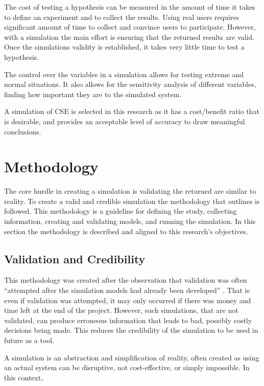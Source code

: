 The cost of testing a hypothesis can be measured in the amount of time it takes to define an experiment and to collect the results.
Using real users requires significant amount of time to collect and convince users to participate.
However, with a simulation the main effort is ensuring that the returned results are valid.
Once the simulations validity is established, it takes very little time to test a hypothesis.

The control over the variables in a simulation allows for testing extreme and normal situations.
It also allows for the sensitivity analysis of different variables, finding how important they are to the simulated system.

A simulation of CSE is selected in this research as it has a cost/benefit ratio that is desirable,
and provides an acceptable level of accuracy to draw meaningful conclusions.

\section{Methodology}
The core hurdle in creating a simulation is validating the returned are similar to reality.
To create a valid and credible simulation the methodology that \citep{Law2005} outlines is followed.
This methodology is a guideline for defining the study, collecting information, creating and validating models, and running the simulation.
In this section the methodology is described and aligned to this research's objectives. 

\subsection{Validation and Credibility}
This methodology was created after the observation that validation was often ``attempted after the simulation models had already been developed'' \citep{Law2005}.
That is even if validation was attempted, it may only occurred if there was money and time left at the end of the project.
However, such simulations, that are not validated, can produce erroneous information that leads to bad, possibly costly decisions being made.
This reduces the credibility of the simulation to be used in future as a tool.

A simulation is an abstraction and simplification of reality, often created as using an actual system can be disruptive, not cost-effective, or simply impossible.
In this context,

